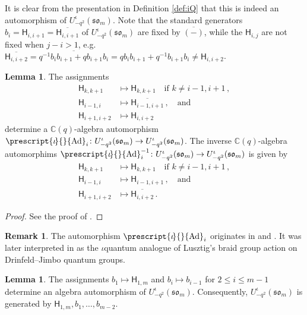 \documentclass[10pt]{amsart}
\numberwithin{equation}{section}
\theoremstyle{definition}
\newtheorem{lem}[thm]{Lemma}
\newtheorem{rem}[thm]{Remark}
\def\C{{\mathbb C}}
\newcommand{\som}[1][m]{\mathfrak{so}_{#1}}
\newcommand{\iqUsom}[1][m]{{U}^{\iota}_{-q^2}(\som[#1])}
\newcommand{\Ad}{\prescript{\iota\!}{}{\mathrm{Ad}}}
\newcommand{\hh}{\mathsf{H}}
\begin{document}
It is clear from the presentation in Definition \ref{def:iQ} that this is indeed an automorphism of $\iqUsom$.
Note that the standard generators $b_i= \hh_{i,i+1}=\overline{\hh_{i,i+1}}$ of $\iqUsom$ are fixed by $\overline{(-)}$, 
while the $\hh_{i,j}$ are not fixed when $j-i>1$, 
e.g.~$\overline{\hh_{i,i+2}} = \overline{q^{-1}b_ib_{i+1} + qb_{i+1}b_{i}}= qb_ib_{i+1} + q^{-1}b_{i+1}b_i\ne \hh_{i,i+2}$.

\begin{lem}\label{lem:internalbraid}
The assignments
\begin{align*}
\hh_{k,k+1}&\mapsto \hh_{k, k+1} \quad \text{if } k\ne i-1, i+1 \, , \\
\hh_{i-1, i}&\mapsto \overline{\hh_{i-1, i+1}} \, , \quad \text{and} \\
\hh_{i+1, i+2}&\mapsto \hh_{i, i+2}
\end{align*}
determine a $\C(q)$-algebra automorphism $\Ad_i \colon \iqUsom\rightarrow \iqUsom$. 
The inverse $\C(q)$-algebra automorphims $\Ad_i^{-1} \colon \iqUsom\rightarrow \iqUsom$
is given by
\begin{align*}
\hh_{k,k+1}&\mapsto \hh_{k, k+1} \quad \text{if } k\ne i-1, i+1 \, , \\
\hh_{i-1, i}&\mapsto \hh_{i-1, i+1} \, , \quad \text{and} \\
\hh_{i+1, i+2}&\mapsto \overline{\hh_{i, i+2}} \, .
\end{align*}
\end{lem}
\begin{proof}
See the proof of \cite[Theorem 2.1]{MolevRagoucyiBraid}.
\end{proof}

\begin{rem}
The automorphism $\Ad_i$ originates in \cite{MolevRagoucyiBraid} and \cite{ChekhoviBraid}.
It was later interpreted in \cite{KolbPellegriniiBraid} as the $\iota$quantum analogue 
of Lusztig's braid group action on Drinfeld--Jimbo quantum groups.
\end{rem}

\begin{lem}\label{lem:shiftauto}
The assignments $b_1 \mapsto \hh_{1,m}$ and 
$b_i \mapsto b_{i-1}$ for $2 \leq i \leq m-1$ determine an algebra automorphism of $\iqUsom$. 
Consequently, $\iqUsom$ is generated by $\hh_{1,m}, b_1,\ldots,b_{m-2}$.
	\end{lem}
	
\end{document}
